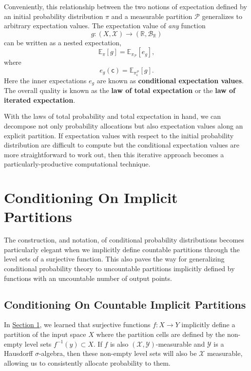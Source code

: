 \documentclass[
  letterpaper,
  DIV=11,
  numbers=noendperiod]{scrartcl}
\begin{document}
Conveniently, this relationship between the two notions of expectation
defined by an initial probability distribution \(\pi\) and a measurable
partition \(\mathcal{P}\) generalizes to arbitrary expectation values.
The expectation value of \emph{any} function \[
g : (X, \mathcal{X}) \rightarrow
    (\mathbb{R}, \mathcal{B}_{\mathbb{R}})
\] can be written as a nested expectation, \[
\mathbb{E}_{\pi}[ g ]
=
\mathbb{E}_{ \pi_{\mathcal{P}} } [ e_{g} ],
\] where \[
e_{g}(\mathsf{c})
=
\mathbb{E}_{ \pi^{\mathcal{P}}_{\mathsf{c}} }[ g ].
\] Here the inner expectations \(e_{g}\) are known as
\textbf{conditional expectation values}. The overall quality is known as
the \textbf{law of total expectation} or the \textbf{law of iterated
expectation}.

With the laws of total probability and total expectation in hand, we can
decompose not only probability allocations but also expectation values
along an explicit partition. If expectation values with respect to the
initial probability distribution are difficult to compute but the
conditional expectation values are more straightforward to work out,
then this iterative approach becomes a particularly-productive
computational technique.

\section{Conditioning On Implicit
Partitions}\label{conditioning-on-implicit-partitions}

The construction, and notation, of conditional probability distributions
becomes particularly elegant when we implicitly define countable
partitions through the level sets of a surjective function. This also
paves the way for generalizing conditional probability theory to
uncountable partitions implicitly defined by functions with an
uncountable number of output points.

\subsection{Conditioning On Countable Implicit
Partitions}\label{sec:cont-impl}

In \hyperref[sec:partitions]{Section 1}, we learned that surjective
functions \(f : X \rightarrow Y\) implicitly define a partition of the
input space \(X\) where the partition cells are defined by the non-empty
level sets \(f^{-1}(y) \subset X\). If \(f\) is also
\((\mathcal{X}, \mathcal{Y})\)-measurable and \(\mathcal{Y}\) is a
Hausdorff \(\sigma\)-algebra, then these non-empty level sets will also
be \(\mathcal{X}\) measurable, allowing us to consistently allocate
probability to them.
\end{document}
